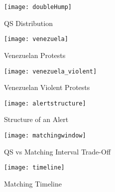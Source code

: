 \begin{figure}
    \texttt{[image: doubleHump]}
    \caption{QS Distribution}
    \label{fig:doubleHump}
\end{figure}

\begin{figure}
    \texttt{[image: venezuela]}
    \caption{Venezuelan Protests}
    \label{fig:venezuela_feb}
\end{figure}

\begin{figure}
    \texttt{[image: venezuela\_violent]}
    \caption{Venezuelan Violent Protests}
    \label{fig:venezuela_violent}
\end{figure}
\begin{figure}
    \texttt{[image: alertstructure]}
    \caption{Structure of an Alert}
    \label{fig:alertstructure}
\end{figure}
\begin{figure}
    \texttt{[image: matchingwindow]}
    \caption{QS vs Matching Interval Trade-Off}
    \label{fig:matchinginterval}
\end{figure}
\begin{figure}
    \texttt{[image: timeline]}
    \caption{Matching Timeline}
    \label{fig:timeline}
\end{figure}















